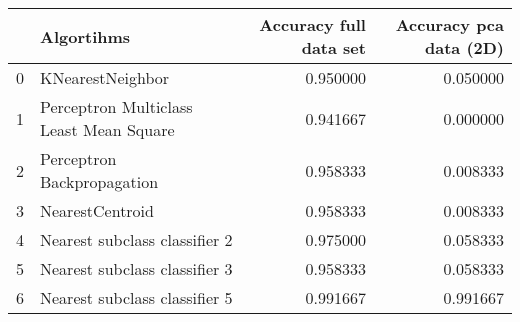\begin{tabular}{llrr}
\toprule
{} &                               Algortihms &  Accuracy full data set &  Accuracy pca data (2D) \\
\midrule
0 &                         KNearestNeighbor &                0.950000 &                0.050000 \\
1 &  Perceptron Multiclass Least Mean Square &                0.941667 &                0.000000 \\
2 &               Perceptron Backpropagation &                0.958333 &                0.008333 \\
3 &                          NearestCentroid &                0.958333 &                0.008333 \\
4 &            Nearest subclass classifier 2 &                0.975000 &                0.058333 \\
5 &            Nearest subclass classifier 3 &                0.958333 &                0.058333 \\
6 &            Nearest subclass classifier 5 &                0.991667 &                0.991667 \\
\bottomrule
\end{tabular}
